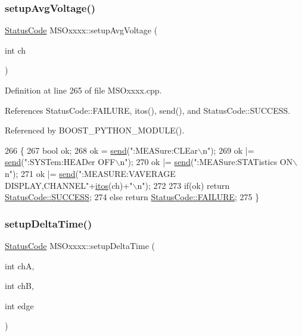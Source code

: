 \subsubsection{\texorpdfstring{setup\+Avg\+Voltage()}{setupAvgVoltage()}}
{\footnotesize\ttfamily \hyperlink{classStatusCode}{Status\+Code} M\+S\+Oxxxx\+::setup\+Avg\+Voltage (\begin{DoxyParamCaption}\item[{int}]{ch }\end{DoxyParamCaption})}



Definition at line 265 of file M\+S\+Oxxxx.\+cpp.



References Status\+Code\+::\+F\+A\+I\+L\+U\+RE, itos(), send(), and Status\+Code\+::\+S\+U\+C\+C\+E\+SS.



Referenced by B\+O\+O\+S\+T\+\_\+\+P\+Y\+T\+H\+O\+N\+\_\+\+M\+O\+D\+U\+L\+E().


\begin{DoxyCode}
266 \{
267     \textcolor{keywordtype}{bool} ok;
268     ok  = \hyperlink{classMSOxxxx_ae77668a1ae4ccb74e0ed5f2485dfdebf}{send}(\textcolor{stringliteral}{":MEASure:CLEar\(\backslash\)n"});
269     ok |=   \hyperlink{classMSOxxxx_ae77668a1ae4ccb74e0ed5f2485dfdebf}{send}(\textcolor{stringliteral}{":SYSTem:HEADer OFF\(\backslash\)n"});    
270     ok |=   \hyperlink{classMSOxxxx_ae77668a1ae4ccb74e0ed5f2485dfdebf}{send}(\textcolor{stringliteral}{":MEASure:STATistics ON\(\backslash\)n"});
271     ok |=   \hyperlink{classMSOxxxx_ae77668a1ae4ccb74e0ed5f2485dfdebf}{send}(\textcolor{stringliteral}{":MEASURE:VAVERAGE DISPLAY,CHANNEL"}+\hyperlink{Tools_8h_af330027dbdafb9a30768b3613c553e60}{itos}(ch)+\textcolor{stringliteral}{"\(\backslash\)n"});
272 
273     \textcolor{keywordflow}{if}(ok)  \textcolor{keywordflow}{return} \hyperlink{classStatusCode_a6f565cbeadc76d14c72f047e5e85eb4badd0da38d3ba0d922efd1f4619bc37ad8}{StatusCode::SUCCESS};
274     \textcolor{keywordflow}{else}        \textcolor{keywordflow}{return} \hyperlink{classStatusCode_a6f565cbeadc76d14c72f047e5e85eb4ba3da73d4c469762eb9d3c960368252b26}{StatusCode::FAILURE};  
275 \}
\end{DoxyCode}
\mbox{\label{classMSOxxxx_abbbebb3e4649c866bcdd853627f12b5d}} 
\subsubsection{\texorpdfstring{setup\+Delta\+Time()}{setupDeltaTime()}}
{\footnotesize\ttfamily \hyperlink{classStatusCode}{Status\+Code} M\+S\+Oxxxx\+::setup\+Delta\+Time (\begin{DoxyParamCaption}\item[{int}]{chA,  }\item[{int}]{chB,  }\item[{int}]{edge }\end{DoxyParamCaption})}



